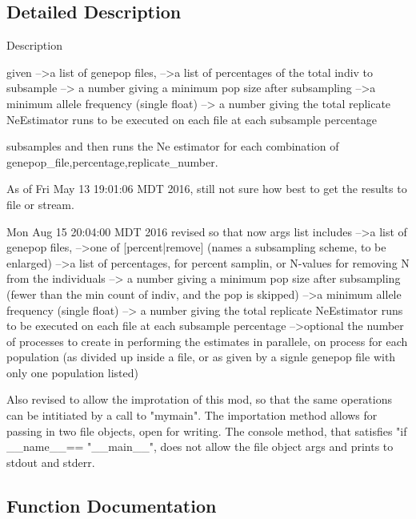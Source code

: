 \subsection{Detailed Description}
\begin{DoxyVerb}Description

given 
    -->a list of genepop files, 
    -->a list of percentages of the total indiv
       to subsample
    --> a number giving a minimum pop size 
       after subsampling
    -->a minimum allele frequency (single float)
    --> a number giving the total replicate NeEstimator runs 
to be executed on each file at each subsample percentage 

    subsamples and then runs the Ne estimator for each combination of 
    genepop_file,percentage,replicate_number. 
    
    As of Fri May 13 19:01:06 MDT 2016, still not sure
    how best to get the results to file or stream.

Mon Aug 15 20:04:00 MDT 2016
    revised so that now args list includes
    -->a list of genepop files, 
    -->one of [percent|remove] (names a subsampling scheme, to be enlarged)
    -->a list of percentages, for percent samplin, or N-values for removing N
from the individuals    
    --> a number giving a minimum pop size 
       after subsampling (fewer than the min count of indiv, and the pop is skipped)
    -->a minimum allele frequency (single float)
    --> a number giving the total replicate NeEstimator runs 
to be executed on each file at each subsample percentage 
    -->optional the number of processes to create in performing the
estimates in parallele, on process for each population (as divided up inside a file,
or as given by a signle genepop file with only one population listed)
    
    Also revised to allow the improtation of this mod, so that the same operations
    can be intitiated by a call to "mymain".  The importation method allows for 
    passing in two file objects, open for writing.  The console method, that satisfies
    "if __name__== "__main__", does not allow the file object args and prints to stdout and stderr.\end{DoxyVerb}
 

\subsection{Function Documentation}

